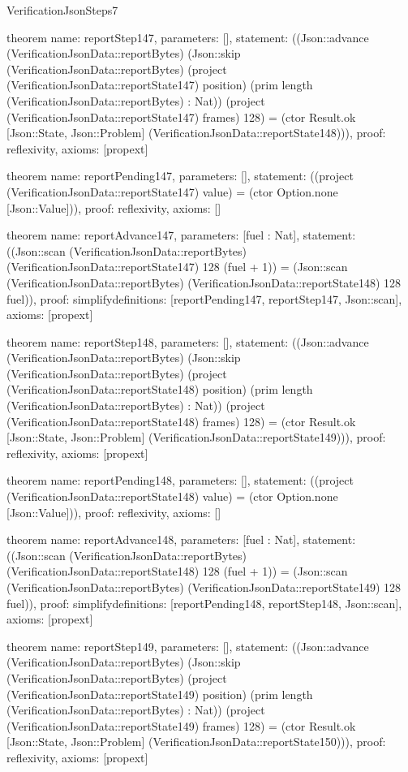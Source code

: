 \begin{lexlean}{VerificationJsonSteps7}
\begin{semanticmodule}
theorem{
  name: reportStep147,
  parameters: [],
  statement: ((Json::advance (VerificationJsonData::reportBytes) (Json::skip (VerificationJsonData::reportBytes) (project (VerificationJsonData::reportState147) position) (prim length (VerificationJsonData::reportBytes) : Nat)) (project (VerificationJsonData::reportState147) frames) 128) = (ctor Result.ok [Json::State, Json::Problem] (VerificationJsonData::reportState148))),
  proof: reflexivity{},
  axioms: [propext]
}

theorem{
  name: reportPending147,
  parameters: [],
  statement: ((project (VerificationJsonData::reportState147) value) = (ctor Option.none [Json::Value])),
  proof: reflexivity{},
  axioms: []
}

theorem{
  name: reportAdvance147,
  parameters: [fuel : Nat],
  statement: ((Json::scan (VerificationJsonData::reportBytes) (VerificationJsonData::reportState147) 128 (fuel + 1)) = (Json::scan (VerificationJsonData::reportBytes) (VerificationJsonData::reportState148) 128 fuel)),
  proof: simplify{definitions: [reportPending147, reportStep147, Json::scan]},
  axioms: [propext]
}

theorem{
  name: reportStep148,
  parameters: [],
  statement: ((Json::advance (VerificationJsonData::reportBytes) (Json::skip (VerificationJsonData::reportBytes) (project (VerificationJsonData::reportState148) position) (prim length (VerificationJsonData::reportBytes) : Nat)) (project (VerificationJsonData::reportState148) frames) 128) = (ctor Result.ok [Json::State, Json::Problem] (VerificationJsonData::reportState149))),
  proof: reflexivity{},
  axioms: [propext]
}

theorem{
  name: reportPending148,
  parameters: [],
  statement: ((project (VerificationJsonData::reportState148) value) = (ctor Option.none [Json::Value])),
  proof: reflexivity{},
  axioms: []
}

theorem{
  name: reportAdvance148,
  parameters: [fuel : Nat],
  statement: ((Json::scan (VerificationJsonData::reportBytes) (VerificationJsonData::reportState148) 128 (fuel + 1)) = (Json::scan (VerificationJsonData::reportBytes) (VerificationJsonData::reportState149) 128 fuel)),
  proof: simplify{definitions: [reportPending148, reportStep148, Json::scan]},
  axioms: [propext]
}

theorem{
  name: reportStep149,
  parameters: [],
  statement: ((Json::advance (VerificationJsonData::reportBytes) (Json::skip (VerificationJsonData::reportBytes) (project (VerificationJsonData::reportState149) position) (prim length (VerificationJsonData::reportBytes) : Nat)) (project (VerificationJsonData::reportState149) frames) 128) = (ctor Result.ok [Json::State, Json::Problem] (VerificationJsonData::reportState150))),
  proof: reflexivity{},
  axioms: [propext]
}


\end{semanticmodule}
\end{lexlean}
